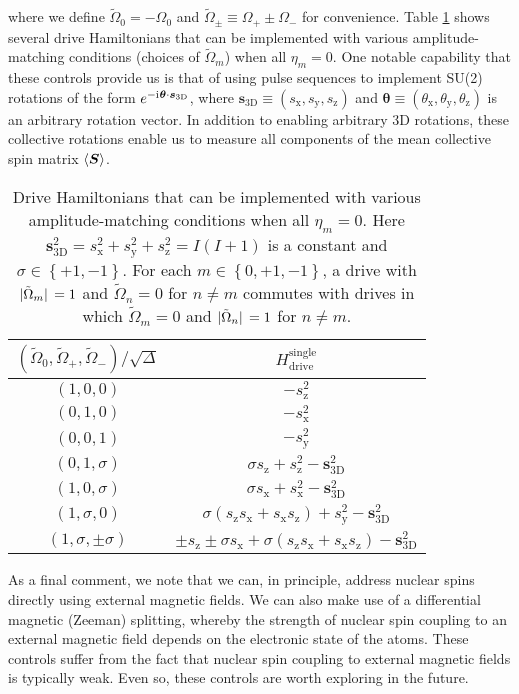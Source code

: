 \documentclass[nofootinbib,notitlepage,11pt]{revtex4-2}
\renewcommand{\t}{\text} %
\newcommand{\p}[1]{\left(#1\right)} %
\renewcommand{\set}[1]{\left\{#1\right\}} %
\newcommand{\bk}{\Braket} %
\renewcommand{\v}{\bm} %
\renewcommand{\c}{\cdot} %
\renewcommand{\i}{\mathrm{i}\mkern1mu} %
\newcommand{\1}{\mathds{1}}
\newcommand{\x}{\text{x}}
\newcommand{\y}{\text{y}}
\newcommand{\z}{\text{z}}
\begin{document}
where we define $\tilde\Omega_0=-\Omega_0$ and $\tilde\Omega_\pm\equiv\Omega_+\pm\Omega_-$ for convenience.
Table \ref{tab:drives} shows several drive Hamiltonians that can be implemented with various amplitude-matching conditions (choices of $\tilde\Omega_m$) when all $\eta_m=0$.
One notable capability that these controls provide us is that of using pulse sequences to implement SU(2) rotations of the form $e^{-\i\v\theta\c\v s_{\t{3D}}}$, where $\v s_{\t{3D}}\equiv\p{s_\x,s_\y,s_\z}$ and $\v\theta\equiv\p{\theta_\x,\theta_\y,\theta_\z}$ is an arbitrary rotation vector.
In addition to enabling arbitrary 3D rotations, these collective rotations enable us to measure all components of the mean collective spin matrix $\bk{\v S}$.

\begin{table}
  \centering
  \caption{Drive Hamiltonians that can be implemented with various amplitude-matching conditions when all $\eta_m=0$.
    Here $\v s_{\t{3D}}^2=s_\x^2+s_\y^2+s_\z^2=I\p{I+1}$ is a constant and $\sigma\in\set{+1,-1}$.  For each $m\in\set{0,+1,-1}$, a drive with $\abs*{\tilde\Omega_m}=1$ and $\tilde\Omega_n=0$ for $n\ne m$ commutes with drives in which $\tilde\Omega_m=0$ and $\abs*{\tilde\Omega_n}=1$ for $n\ne m$.}
  \begin{tabular}{c|c}
    $(\tilde\Omega_0,\tilde\Omega_+,\tilde\Omega_-)/\sqrt{\Delta}$
    & $H_{\t{drive}}^{\t{single}}$
    \\ \hline\hline
    $\p{1,0,0}$ & $-s_\z^2$
    \\ \hline
    $\p{0,1,0}$ & $-s_\x^2$
    \\ \hline
    $\p{0,0,1}$ & $-s_\y^2$
    \\ \hline
    $\p{0,1,\sigma}$ & $\sigma s_\z + s_\z^2 - \v s_{\t{3D}}^2$
    \\ \hline
    $\p{1,0,\sigma}$ & $\sigma s_\x + s_\x^2 - \v s_{\t{3D}}^2$
    \\ \hline
    $\p{1,\sigma,0}$
    & $\sigma\p{s_\z s_\x+s_\x s_\z} + s_\y^2 - \v s_{\t{3D}}^2$
    \\ \hline
    $\p{1,\sigma,\pm\sigma}$
    & $\pm s_\z \pm \sigma s_\x
    + \sigma \p{s_\z s_\x + s_\x s_\z} - \v s_{\t{3D}}^2$
  \end{tabular}
  \label{tab:drives}
\end{table}

As a final comment, we note that we can, in principle, address nuclear spins directly using external magnetic fields.
We can also make use of a differential magnetic (Zeeman) splitting, whereby the strength of nuclear spin coupling to an external magnetic field depends on the electronic state of the atoms.
These controls suffer from the fact that nuclear spin coupling to external magnetic fields is typically weak.
Even so, these controls are worth exploring in the future.
\end{document}
